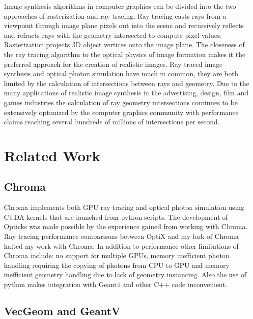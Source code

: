 \documentclass[a4paper]{jpconf}
\begin{document}
Image synthesis algorithms in computer graphics can be divided into 
the two approaches of rasterization and ray tracing. 
Ray tracing casts rays from a viewpoint through image plane pixels out 
into the scene and recursively reflects and refracts rays with the geometry intersected 
to compute pixel values. Rasterization projects 3D object vertices onto the image plane.
The closeness of the ray tracing algorithm to the optical physics of image formation
makes it the preferred approach for the creation of realistic images. 
Ray traced image synthesis and optical photon simulation have much in common, 
they are both limited by the calculation of intersections between rays and geometry.  
Due to the many applications of realistic image synthesis in the 
advertising, design, film and games industries the calculation of ray geometry intersections 
continues to be extensively optimized by the computer graphics community with performance claims 
reaching several hundreds of millions of intersections per second\cite{understanding}\cite{understandingAddendum}.


\section{Related Work}

\subsection{Chroma}

Chroma\cite{chromaURL}\cite{chromaB} implements both GPU ray tracing and optical photon simulation 
using CUDA kernels that are launched from python scripts. 
The development of Opticks was made possible by the experience gained from working with Chroma.
Ray tracing performance comparisons between OptiX and my 
fork of Chroma\cite{chromaFork} halted my work with Chroma.
In addition to performance other limitations of Chroma include:
no support for multiple GPUs, memory inefficient photon handling requiring the copying of photons from CPU to GPU
and memory inefficient geometry handling due to lack of geometry instancing.
Also the use of python makes integration with Geant4 and other C++ code inconvenient. 

\subsection{VecGeom and GeantV}

\end{document}
